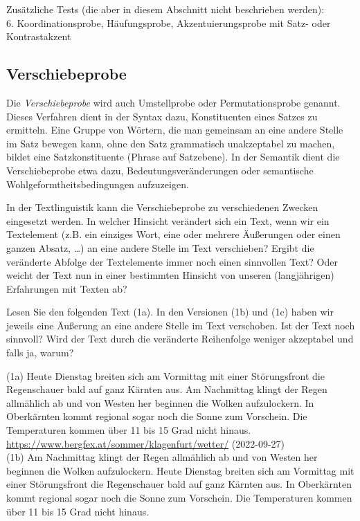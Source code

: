 \documentclass[
  letterpaper,
  DIV=11,
  numbers=noendperiod]{scrreprt}
\begin{document}
Zusätzliche Tests (die aber in diesem Abschnitt nicht beschrieben
werden):\\
6. Koordinationsprobe, Häufungsprobe, Akzentuierungsprobe mit Satz- oder
Kontrastakzent

\hypertarget{verschiebeprobe}{%
\subsection{Verschiebeprobe}\label{verschiebeprobe}}

Die \emph{Verschiebeprobe} wird auch Umstellprobe oder Permutationsprobe
genannt. Dieses Verfahren dient in der Syntax dazu, Konstituenten eines
Satzes zu ermitteln. Eine Gruppe von Wörtern, die man gemeinsam an eine
andere Stelle im Satz bewegen kann, ohne den Satz grammatisch
unakzeptabel zu machen, bildet eine Satzkonstituente (Phrase auf
Satzebene). In der Semantik dient die Verschiebeprobe etwa dazu,
Bedeutungsveränderungen oder semantische Wohlgeformtheitsbedingungen
aufzuzeigen.

In der Textlinguistik kann die Verschiebeprobe zu verschiedenen Zwecken
eingesetzt werden. In welcher Hinsicht verändert sich ein Text, wenn wir
ein Textelement (z.B. ein einziges Wort, eine oder mehrere Äußerungen
oder einen ganzen Absatz, \ldots) an eine andere Stelle im Text
verschieben? Ergibt die veränderte Abfolge der Textelemente immer noch
einen sinnvollen Text? Oder weicht der Text nun in einer bestimmten
Hinsicht von unseren (langjährigen) Erfahrungen mit Texten ab?

Lesen Sie den folgenden Text (1a). In den Versionen (1b) und (1c) haben
wir jeweils eine Äußerung an eine andere Stelle im Text verschoben. Ist
der Text noch sinnvoll? Wird der Text durch die veränderte Reihenfolge
weniger akzeptabel und falls ja, warum?

(1a) Heute Dienstag breiten sich am Vormittag mit einer Störungsfront
die Regenschauer bald auf ganz Kärnten aus. Am Nachmittag klingt der
Regen allmählich ab und von Westen her beginnen die Wolken aufzulockern.
In Oberkärnten kommt regional sogar noch die Sonne zum Vorschein. Die
Temperaturen kommen über 11 bis 15 Grad nicht hinaus.
\url{https://www.bergfex.at/sommer/klagenfurt/wetter/} (2022-09-27)\\

(1b) Am Nachmittag klingt der Regen allmählich ab und von Westen her
beginnen die Wolken aufzulockern. Heute Dienstag breiten sich am
Vormittag mit einer Störungsfront die Regenschauer bald auf ganz Kärnten
aus. In Oberkärnten kommt regional sogar noch die Sonne zum Vorschein.
Die Temperaturen kommen über 11 bis 15 Grad nicht hinaus.
\end{document}

